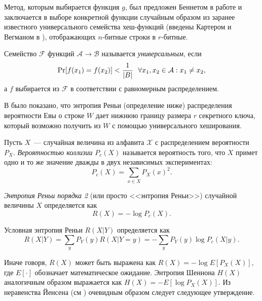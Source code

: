 Метод, которым выбирается функция $g$, был предложен Беннетом в работе \cite{privacy_amplification_by_public_discussion} и заключается в выборе конкретной функции случайным образом из заранее известного универсального семейства хеш-функций (введены Картером и Вегманом в \cite{universal_hashing}), отображающих $n$-битные строки в $r$-битные.

\begin{definition}
  Семейство $\mathcal{F}$ функций $\mathcal{A}\rightarrow\mathcal{B}$ называется \textit{универсальным}, если 
  $$  \operatorname{Pr}[f(x_1) = f(x_2)] < \frac{1}{|B|} ~~\forall x_1, x_2 \in \mathcal{A}: x_1 \neq x_2, $$ а $f$ выбирается из $\mathcal{F}$ в соответствии с равномерным распределением.
\end{definition}

В \cite{privacy_amplification} было показано, что энтропия Реньи (определение ниже) распределения вероятности Евы о строке $W$ дает нижнюю границу размера $r$ секретного ключа, который возможно получить из $W$ с помощью универсального хеширования.

\begin{definition}
  Пусть $X$~--- случайная величина из алфавита $\mathcal{X}$ с распределением вероятности $P_X$. \textit{Вероятностью коллизии} $P_c(X)$ называется вероятность того, что $X$ примет одно и то же значение дважды в двух независимых экспериментах:
  \begin{equation}
    P_c(X) = \sum_{x\in X} P_X(x)^2.
  \end{equation}
\end{definition}

\begin{definition}
  \textit{Энтропия Реньи порядка 2} (или просто <<энтропия Реньи>>) случайной величины $X$ определяется как 
  \begin{equation}
    R(X) = -\log P_c(X).
  \end{equation}
\end{definition}

\begin{definition}
  Условная энтропия Реньи $R(X|Y)$ определяется как
  \begin{equation}
    R(X|Y) = \sum_y P_Y(y) R(X|Y=y) = -\sum_y P_Y(y) \log P_c(X|y).
  \end{equation}
\end{definition}

Иначе говоря, $R(X)$ может быть выражена как $R(X) = -\log E[P_X(X)]$, где $E[\cdot]$ обозначает математическое ожидание. Энтропия Шеннона $H(X)$ аналогичным образом выражается как $H(X) = -E[\log P_X(X)]$. Из неравенства Йенсена (см \cite{jensens_inequality}) очевидным образом следует следующее утверждение.

